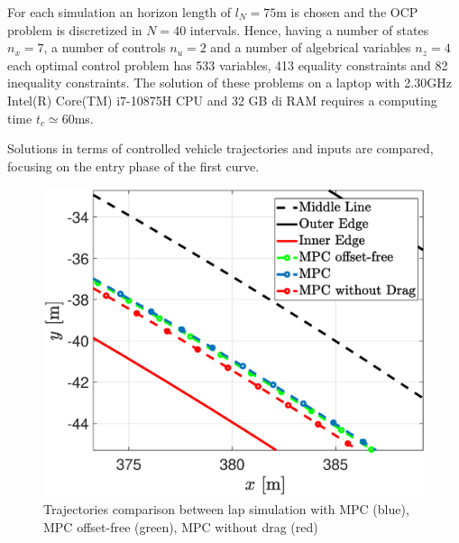\documentclass[conference]{IEEEtran} %
\begin{document}
For each simulation an horizon length of $l_N = 75$m is chosen and the OCP problem is discretized in $N = 40$ intervals. Hence, having a number of states $n_x = 7$, a number of controls $n_u = 2$ and a number of algebrical variables $n_z = 4$ each optimal control problem has 533 variables, 413 equality constraints and 82 inequality constraints. The solution of these problems on a laptop with 2.30GHz
Intel(R) Core(TM) i7-10875H CPU and 32 GB di RAM requires a computing time $t_c \simeq 60$ms.

Solutions in terms of controlled vehicle trajectories and inputs are compared, focusing on the entry phase of the first curve.

\begin{figure}[htb] \centering
    \includegraphics[width=1.\linewidth]{Trajectories2}
	\caption{Trajectories comparison between lap simulation with MPC (blue), MPC offset-free (green), MPC without drag (red)}
	\label{fig:Trajectories2}
\end{figure}
\end{document}
